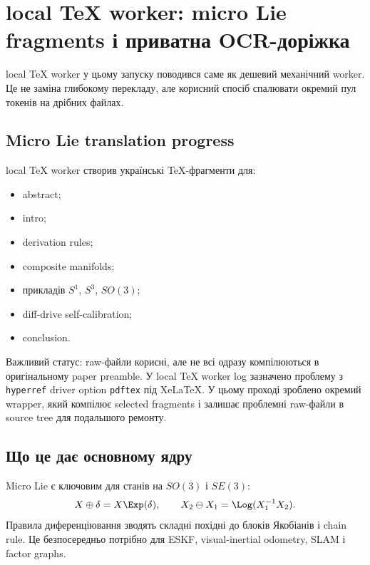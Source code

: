 \chapter{local TeX worker: micro Lie fragments і приватна OCR-доріжка}
\label{chap:spark-session07}


local TeX worker у цьому запуску поводився саме як дешевий механічний worker. Це не заміна глибокому перекладу, але корисний спосіб спалювати окремий пул токенів на дрібних файлах.

\section{Micro Lie translation progress}

local TeX worker створив українські TeX-фрагменти для:
\begin{itemize}[leftmargin=*]
\item abstract;
\item intro;
\item derivation rules;
\item composite manifolds;
\item прикладів $S^1$, $S^3$, $SO(3)$;
\item diff-drive self-calibration;
\item conclusion.
\end{itemize}

Важливий статус: raw-файли корисні, але не всі одразу компілюються в оригінальному paper preamble. У local TeX worker log зазначено проблему з \texttt{hyperref} driver option \texttt{pdftex} під XeLaTeX. У цьому проході зроблено окремий wrapper, який компілює selected fragments і залишає проблемні raw-файли в source tree для подальшого ремонту.

\section{Що це дає основному ядру}

Micro Lie є ключовим для станів на $SO(3)$ і $SE(3)$:
\begin{equation}
  X\oplus\delta = X\Exp(\delta),\qquad X_2\ominus X_1=\Log(X_1^{-1}X_2).
\end{equation}
Правила диференціювання зводять складні похідні до блоків Якобіанів і chain rule. Це безпосередньо потрібно для ESKF, visual-inertial odometry, SLAM і factor graphs.

